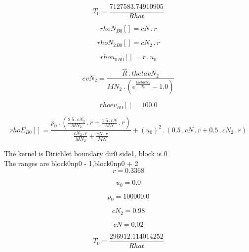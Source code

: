\documentclass{article}
\begin{document}
\begin{dmath}T_{0} = \frac{7127583.74910905}{Rhat}\end{dmath}

\begin{dmath}{rhoN{_{B0}}}[{}] = cN \,.\, r\end{dmath}

\begin{dmath}{rhoN_{2}{_{B0}}}[{}] = cN_{2} \,.\, r\end{dmath}

\begin{dmath}{rhou_{0}{_{B0}}}[{}] = r \,.\, u_{0}\end{dmath}

\begin{dmath}evN_{2} = \frac{\hat{R} \,.\, thetavN_{2}}{MN_{2} \,.\, \left(e^{\frac{thetavN_{2}}{T_{0}}} - 1.0\right)}\end{dmath}

\begin{dmath}{rhoev{_{B0}}}[{}] = 100.0\end{dmath}

\begin{dmath}{rhoE{_{B0}}}[{}] = \frac{p_{0} \,.\, \left(\frac{2.5 \,.\, cN_{2}}{MN_{2}} \,.\, r + \frac{1.5 \,.\, cN}{MN} \,.\, r\right)}{\frac{cN_{2} \,.\, r}{MN_{2}} + \frac{cN \,.\, r}{MN}} + \left(u_{0} \right)^{2} \,.\, \left(0.5 \,.\, cN \,.\, 
r + 0.5 \,.\, cN_{2} \,.\, r\right)\end{dmath}

\noindent The kernel is Dirichlet boundary dir0 side1, block is 0\\\noindent The ranges are block0np0 - 1,block0np0 + 2\\\begin{dmath}r = 0.3368\end{dmath}

\begin{dmath}u_{0} = 0.0\end{dmath}

\begin{dmath}p_{0} = 100000.0\end{dmath}

\begin{dmath}cN_{2} = 0.98\end{dmath}

\begin{dmath}cN = 0.02\end{dmath}

\begin{dmath}T_{0} = \frac{296912.114014252}{Rhat}\end{dmath}
\end{document}

